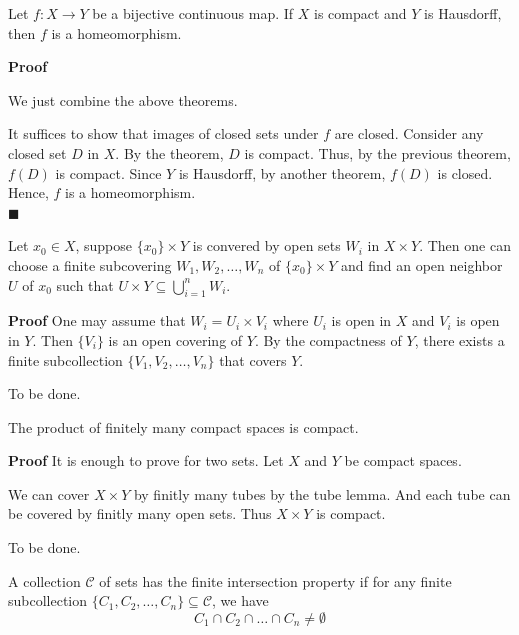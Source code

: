 \documentclass[main.tex]{subfiles}
\begin{document}
\begin{theorem}
    Let $f: X \rightarrow Y$ be a bijective continuous map. If $X$ is compact and $Y$ is Hausdorff, then $f$ is a homeomorphism.
\end{theorem}
\par \noindent \textbf{Proof} 
\par We just combine the above theorems. 
\par It suffices to show that images of closed sets under $f$ are closed. Consider any closed set $D$ in $X$. By the theorem, $D$ is compact. Thus, by the previous theorem, $f(D)$ is compact. Since $Y$ is Hausdorff, by another theorem, $f(D)$ is closed. Hence, $f$ is a homeomorphism.
\mbox{} \\ \null \hfill $\blacksquare$  

\begin{lemma}
    Let $x_0\in X$, suppose $\{x_0\}\times Y$ is convered by open sets $W_i$ in $X \times Y$. Then one can choose a finite subcovering $W_1, W_2, \ldots, W_n$ of $\{x_0\}\times Y$ and find an open neighbor $U$ of $x_0$ such that $U \times Y \subseteq \bigcup_{i=1}^{n} W_i$.
\end{lemma}
\par \noindent \textbf{Proof} One may assume that $W_i = U_i \times V_i$ where $U_i$ is open in $X$ and $V_i$ is open in $Y$. Then $\{V_i\}$ is an open covering of $Y$. By the compactness of $Y$, there exists a finite subcollection $\{V_1, V_2, \ldots, V_n\}$ that covers $Y$. 

\par To be done. 

\begin{theorem}
    The product of finitely many compact spaces is compact. 
\end{theorem}
\par \noindent \textbf{Proof} It is enough to prove for two sets. Let $X$ and $Y$ be compact spaces. 
\par We can cover $X\times Y$ by finitly many tubes by the tube lemma. And each tube can be covered by finitly many open sets. Thus $X \times Y$ is compact.
\par To be done. 

\begin{definition}
    A collection $\mathcal{C}$ of sets has the finite intersection property if for any finite subcollection $\{C_1, C_2, \ldots, C_n\} \subseteq \mathcal{C}$, we have
    \begin{equation}
        C_1 \cap C_2 \cap \ldots \cap C_n \neq \emptyset
    \end{equation}
\end{definition}
\end{document}
